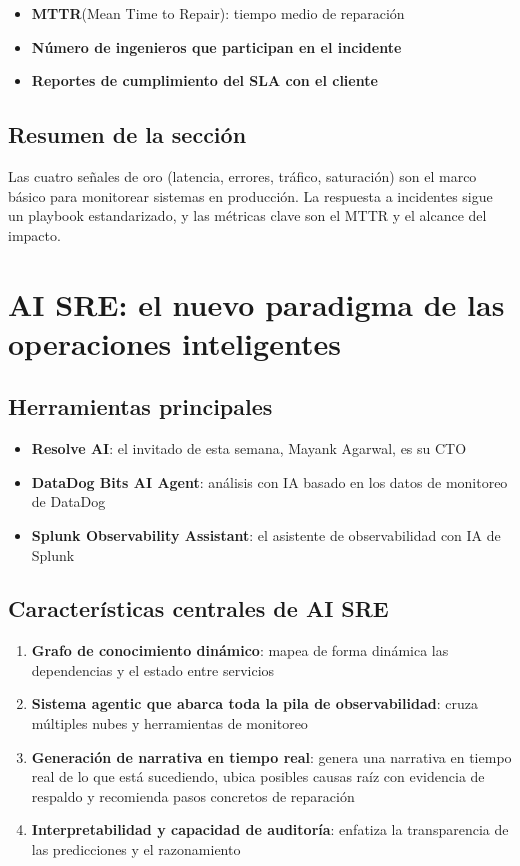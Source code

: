 \documentclass[a4paper]{article}
\begin{document}
\begin{itemize}
    \item \textbf{MTTR}(Mean Time to Repair): tiempo medio de reparación
    \item \textbf{Número de ingenieros que participan en el incidente}
    \item \textbf{Reportes de cumplimiento del SLA con el cliente}
\end{itemize}

\subsection{Resumen de la sección}

Las cuatro señales de oro (latencia, errores, tráfico, saturación) son el marco básico para monitorear sistemas en producción. La respuesta a incidentes sigue un playbook estandarizado, y las métricas clave son el MTTR y el alcance del impacto.

\section{AI SRE: el nuevo paradigma de las operaciones inteligentes}

\subsection{Herramientas principales}

\begin{itemize}
    \item \textbf{Resolve AI}: el invitado de esta semana, Mayank Agarwal, es su CTO
    \item \textbf{DataDog Bits AI Agent}: análisis con IA basado en los datos de monitoreo de DataDog
    \item \textbf{Splunk Observability Assistant}: el asistente de observabilidad con IA de Splunk
\end{itemize}

\subsection{Características centrales de AI SRE}

\begin{enumerate}
    \item \textbf{Grafo de conocimiento dinámico}: mapea de forma dinámica las dependencias y el estado entre servicios
    \item \textbf{Sistema agentic que abarca toda la pila de observabilidad}: cruza múltiples nubes y herramientas de monitoreo
    \item \textbf{Generación de narrativa en tiempo real}: genera una narrativa en tiempo real de lo que está sucediendo, ubica posibles causas raíz con evidencia de respaldo y recomienda pasos concretos de reparación
    \item \textbf{Interpretabilidad y capacidad de auditoría}: enfatiza la transparencia de las predicciones y el razonamiento
\end{enumerate}
\end{document}
